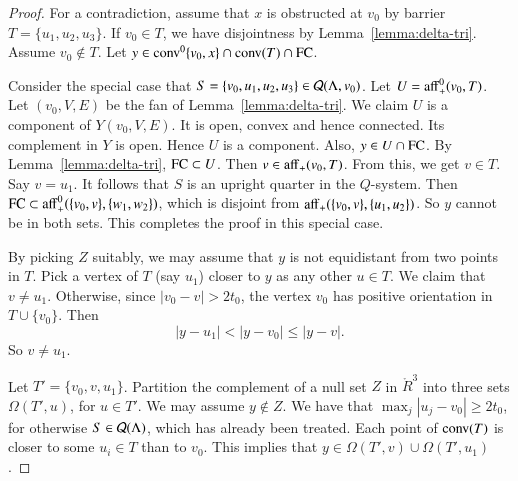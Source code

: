 \begin{proof} 
For a contradiction, assume that $x$ is obstructed
at $v_0$ by barrier $T =\{u_1,u_2,u_3\}$.
If $v_0\in T$, we have disjointness by Lemma~\ref{lemma:delta-tri}. Assume $v_0\not\in T$.
Let $y\in {\operatorname{conv}}^0\{v_0,x\}\cap {\operatorname{conv}}(T)\cap {\operatorname{FC}}$.  




Consider the special case that $S=\{v_0,u_1,u_2,u_3\}\in{\mathcal Q}(\Lambda,v_0)$.  
Let 
$U={\operatorname{aff}}_+^0(v_0,T)$.  
Let $(v_0,V,E)$ be the fan of Lemma~\ref{lemma:delta-tri}.
We claim $U$ is a component of
$Y(v_0,V,E)$.  It is open, convex and hence connected.  Its
complement in $Y$ is open.  Hence $U$ is a component.
Also, $y\in U\cap {\operatorname{FC}}$.  By Lemma~\ref{lemma:delta-tri}, ${\operatorname{FC}}\subset U$.  Then
$v\in {\operatorname{aff}}_+(v_0,T)$.  From this, we get $v\in T$.  Say $v=u_1$.
It follows that $S$ is an upright quarter in the $Q$-system.
Then ${\operatorname{FC}}\subset {\operatorname{aff}}_+^0(\{v_0,v\},\{w_1,w_2\})$, which is disjoint from
${\operatorname{aff}}_+(\{v_0,v\},\{u_1,u_2\})$.  So $y$ cannot be in both sets.  This
completes the proof in this special case.

By picking $Z$ suitably, we may assume that $y$ is not equidistant from
two points in $T$.  
Pick
a vertex of $T$ (say $u_1$)  closer to $y$ as any other
$u\in T$.  We claim that $v\ne u_1$.  Otherwise, 
since $|v_0-v|>2t_0$, the vertex $v_0$ has positive
orientation in $T\cup\{v_0\}$.  Then
  $$
  |y - u_1| < |y - v_0| \le |y - v|.
  $$
So $v\ne u_1$.


Let $T'= \{v_0,v,u_1\}$.
Partition the complement of a null set $Z$ in $\ring{R}^3$ 
into three sets $\Omega(T',u)$, for $u\in T'$.  We may assume $y\not\in Z$.
We have  that $\max_j |u_j-v_0| \ge 2t_0$, for otherwise
$S\in{\mathcal Q}(\Lambda)$, which has already been treated. 
Each point of ${\operatorname{conv}}(T)$ is closer to some $u_i\in T$ than to $v_0$.
This implies that $y\in \Omega(T',v) \cup \Omega(T',u_1)$.  


\end{proof}
